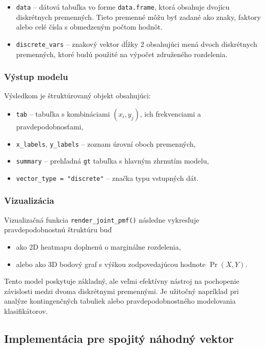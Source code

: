 \begin{itemize}
  \item \texttt{data} – dátová tabuľka vo forme \texttt{data.frame}, ktorá obsahuje dvojicu diskrétnych premenných. Tieto premenné môžu byť zadané ako znaky, faktory alebo celé čísla s obmedzeným počtom hodnôt.
  \item \texttt{discrete\_vars} – znakový vektor dĺžky 2 obsahujúci mená dvoch diskrétnych premenných, ktoré budú použité na výpočet združeného rozdelenia.
\end{itemize}

\subsubsection{Výstup modelu}
Výsledkom je štruktúrovaný objekt obsahujúci:
\begin{itemize}
  \item \texttt{tab} – tabuľka s kombináciami $(x_i, y_j)$, ich frekvenciami a pravdepodobnosťami,
  \item \texttt{x\_labels}, \texttt{y\_labels} – zoznam úrovní oboch premenných,
  \item \texttt{summary} – prehľadná \texttt{gt} tabuľka s hlavným zhrnutím modelu,
  \item \texttt{vector\_type = "discrete"} – značka typu vstupných dát.
\end{itemize}

\subsubsection{Vizualizácia}
Vizualizačná funkcia \texttt{render\_joint\_pmf()} následne vykresľuje pravdepodobnostnú štruktúru buď

\begin{itemize}
  \item ako 2D heatmapu doplnenú o marginálne rozdelenia,
  \item alebo ako 3D bodový graf s výškou zodpovedajúcou hodnote $\Pr(X,Y)$.
\end{itemize}

Tento model poskytuje základný, ale veľmi efektívny nástroj na pochopenie závislosti medzi dvoma diskrétnymi premennými. Je užitočný napríklad pri analýze kontingenčných tabuliek alebo pravdepodobnostného modelovania klasifikátorov.

\subsection{Implementácia pre spojitý náhodný vektor}

